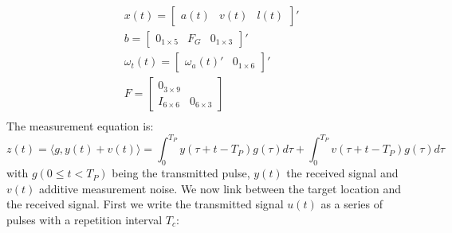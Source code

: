 \documentclass[oneside,12pt]{article}
\begin{document}
\begin{equation}\label{eq:target_mat}
    \begin{split}
        &x(t) = {\begin{bmatrix} a(t) & v(t) & l(t) \end{bmatrix}}'\\
        &b = {\begin{bmatrix} 0_{1 \times 5} & F_G & 0_{1 \times 3} \end{bmatrix}}'\\
        &\omega_t(t) = {\begin{bmatrix} \omega_a(t)' & 0_{1 \times 6} \end{bmatrix}}'\\
        &F = \begin{bmatrix} 
        0_{3 \times 9}\\
        I_{6 \times 6} & 0_{6 \times 3}
        \end{bmatrix}\\
    \end{split}
\end{equation}
%
The measurement equation is:
%
\begin{equation}\label{eq:radar_meas}
    z(t) = \langle g, y(t) + v(t) \rangle = \int_{0}^{T_P} y(\tau + t - T_P) g(\tau) d\tau + \int_{0}^{T_P} v(\tau + t - T_P) g(\tau) d\tau
\end{equation}
%
with $g(0 \leq t < T_P)$ being the transmitted pulse, $y(t)$ the received signal and $v(t)$ additive measurement noise. We now link between the target location and the received signal. First we write the transmitted signal $u(t)$ as a series of pulses with a repetition interval $T_c$:
\end{document}
